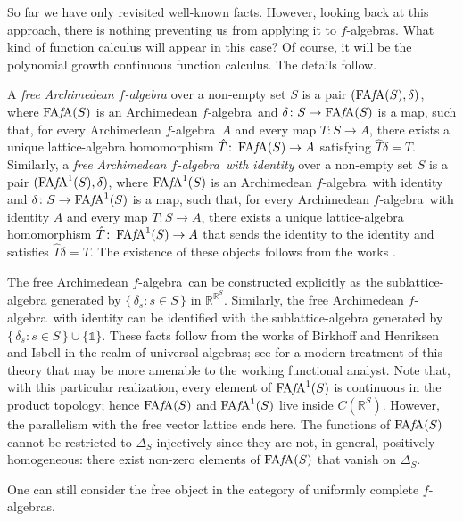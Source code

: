 \documentclass{amsart}
\theoremstyle{plain}
\theoremstyle{definition}
\theoremstyle{remark}
\newcommand\R{\ensuremath{\mathbb{R}}}
\newcommand{\one}{\mathbb{1}}
\newcommand{\falg}{$f\!$-algebra}
\newcommand{\FAFA}[1]{\operatorname{FA{\it f}\!A}(#1)}
\newcommand{\uFAFA}[1]{\operatorname{FA{\it f}\!A}^1(#1)}
\begin{document}
So far we have only revisited well-known facts. However, looking back at this
approach, there is nothing preventing us from applying it to
\falg s. What kind of function calculus will appear in this case? Of
course, it will be the polynomial growth continuous function calculus. The
details follow.

A \emph{free Archimedean \falg} over a non-empty set $S$ is a pair $(\FAFA S,
\delta )$, where $\FAFA S$ is an Archimedean \falg\ and $\delta \colon S\to \FAFA
S$ is a map, such that, for every Archimedean \falg\ $A$ and every map $T\colon
S\to A$, there exists a unique lattice-algebra homomorphism
$\hat{T}\colon \FAFA S\to A$ satisfying $\hat{T}\delta =T$.
Similarly, a \emph{free Archimedean \falg\ with identity} over a non-empty set
$S$ is a pair $(\uFAFA S,
\delta )$, where $\uFAFA S$ is an Archimedean \falg\ with identity and $\delta
\colon S\to \uFAFA
S$ is a map, such that, for every Archimedean \falg\ with identity $A$ and every map $T\colon
S\to A$, there exists a unique lattice-algebra homomorphism
$\hat{T}\colon \uFAFA S\to A$ that sends the identity to the identity and
satisfies $\hat{T}\delta =T$. The
existence of these objects follows from the works
\cite{birkhoff1942,henriksen_isbell1962}.

The free Archimedean \falg\ can be constructed explicitly as
the sublattice-algebra generated by $\{\, \delta _s : s \in S \, \} $
in $\R^{\R^{S}}$. Similarly, the free Archimedean \falg\ with identity can
be identified with the sublattice-algebra generated by $\{\, \delta _s
: s \in S \, \} \cup \{\one\}$. These facts follow from the works of
Birkhoff \cite{birkhoff1935} and Henriksen and Isbell
\cite{henriksen_isbell1962} in the realm of universal algebras; see
\cite[Chapter 2]{munoz-lahoz_tradacete2025} for a modern treatment
of this theory that may be more amenable to the working functional
analyst. Note that, with this particular
realization, every element of $\uFAFA S$ is continuous in the product
topology; hence $\FAFA S$ and $\uFAFA S$ live inside $C(\R^{S})$. However, the
parallelism with the free vector lattice ends here. The functions of $\FAFA S$
cannot be restricted to $\Delta _S$ injectively since they are not,
in general, positively homogeneous: there exist non-zero elements of
$\FAFA S$ that vanish on $\Delta _S$.

One can still consider the free object in the category of uniformly
complete \falg s.
\end{document}
